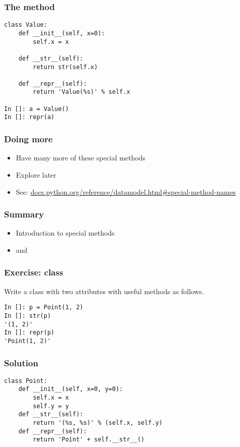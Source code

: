 \documentclass[14pt,compress,aspectratio=169]{beamer}
\begin{document}
\begin{frame}[fragile]
  \frametitle{The  method}
\begin{lstlisting}
class Value:
    def __init__(self, x=0):
        self.x = x

    def __str__(self):
        return str(self.x)

    def __repr__(self):
        return 'Value(%s)' % self.x

In []: a = Value()
In []: repr(a)

\end{lstlisting}
\end{frame}

\begin{frame}
  \frametitle{Doing more}
  \begin{itemize}
  \item Have many more of these special methods
  \item Explore later
  \item See: \url{docs.python.org/reference/datamodel.html\#special-method-names}
  \end{itemize}

\end{frame}


\begin{frame}
  \frametitle{Summary}
  \begin{itemize}
  \item Introduction to special methods
  \item {} and 
  \end{itemize}
\end{frame}

\begin{frame}
  \frametitle{Exercise:  class}
  \begin{block}{}
    Write a  class with two attributes  with useful
     methods as follows.
  \end{block}

\begin{lstlisting}
In []: p = Point(1, 2)
In []: str(p)
'(1, 2)'
In []: repr(p)
'Point(1, 2)'
\end{lstlisting}
\end{frame}


\begin{frame}
  \frametitle{Solution}
\begin{lstlisting}
class Point:
    def __init__(self, x=0, y=0):
        self.x = x
        self.y = y
    def __str__(self):
        return '(%s, %s)' % (self.x, self.y)
    def __repr__(self):
        return 'Point' + self.__str__()
\end{lstlisting}
\end{frame}
\end{document}
